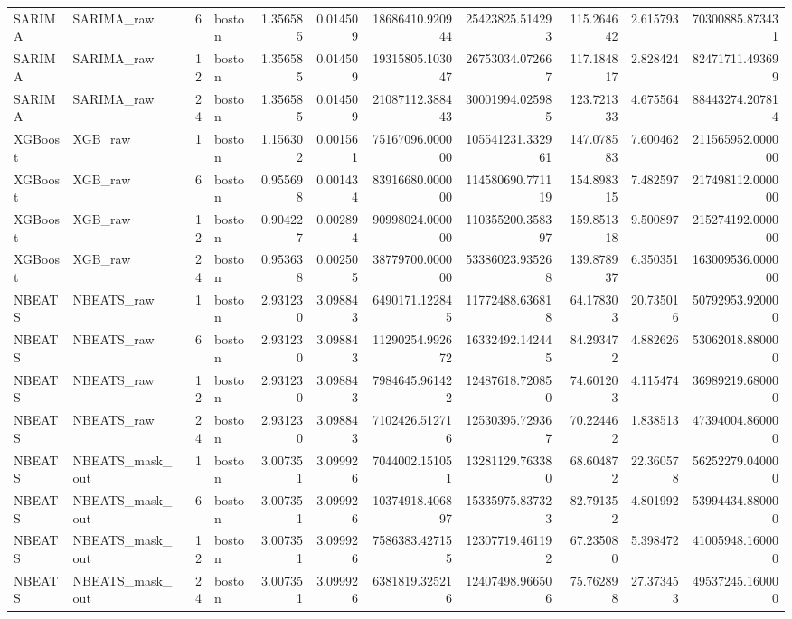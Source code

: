 \begin{longtable}{llrlrrrrrrr}
SARIMA & SARIMA\_raw & 6 & boston & 1.356585 & 0.014509 & 18686410.920944 & 25423825.514293 & 115.264642 & 2.615793 & 70300885.873431 \\
SARIMA & SARIMA\_raw & 12 & boston & 1.356585 & 0.014509 & 19315805.103047 & 26753034.072667 & 117.184817 & 2.828424 & 82471711.493699 \\
SARIMA & SARIMA\_raw & 24 & boston & 1.356585 & 0.014509 & 21087112.388443 & 30001994.025985 & 123.721333 & 4.675564 & 88443274.207814 \\
XGBoost & XGB\_raw & 1 & boston & 1.156302 & 0.001561 & 75167096.000000 & 105541231.332961 & 147.078583 & 7.600462 & 211565952.000000 \\
XGBoost & XGB\_raw & 6 & boston & 0.955698 & 0.001434 & 83916680.000000 & 114580690.771119 & 154.898315 & 7.482597 & 217498112.000000 \\
XGBoost & XGB\_raw & 12 & boston & 0.904227 & 0.002894 & 90998024.000000 & 110355200.358397 & 159.851318 & 9.500897 & 215274192.000000 \\
XGBoost & XGB\_raw & 24 & boston & 0.953638 & 0.002505 & 38779700.000000 & 53386023.935268 & 139.878937 & 6.350351 & 163009536.000000 \\
NBEATS & NBEATS\_raw & 1 & boston & 2.931230 & 3.098843 & 6490171.122845 & 11772488.636818 & 64.178303 & 20.735016 & 50792953.920000 \\
NBEATS & NBEATS\_raw & 6 & boston & 2.931230 & 3.098843 & 11290254.992672 & 16332492.142445 & 84.293472 & 4.882626 & 53062018.880000 \\
NBEATS & NBEATS\_raw & 12 & boston & 2.931230 & 3.098843 & 7984645.961422 & 12487618.720850 & 74.601203 & 4.115474 & 36989219.680000 \\
NBEATS & NBEATS\_raw & 24 & boston & 2.931230 & 3.098843 & 7102426.512716 & 12530395.729367 & 70.224462 & 1.838513 & 47394004.860000 \\
NBEATS & NBEATS\_mask\_out & 1 & boston & 3.007351 & 3.099926 & 7044002.151051 & 13281129.763380 & 68.604872 & 22.360578 & 56252279.040000 \\
NBEATS & NBEATS\_mask\_out & 6 & boston & 3.007351 & 3.099926 & 10374918.406897 & 15335975.837323 & 82.791352 & 4.801992 & 53994434.880000 \\
NBEATS & NBEATS\_mask\_out & 12 & boston & 3.007351 & 3.099926 & 7586383.427155 & 12307719.461192 & 67.235080 & 5.398472 & 41005948.160000 \\
NBEATS & NBEATS\_mask\_out & 24 & boston & 3.007351 & 3.099926 & 6381819.325216 & 12407498.966506 & 75.762898 & 27.373453 & 49537245.160000 \\

\end{longtable}

